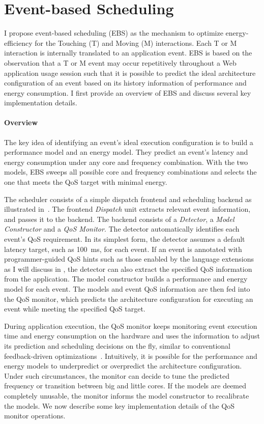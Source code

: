\section{Event-based Scheduling}
\label{sec:runtime:ebs}

I propose event-based scheduling (EBS) as the mechanism to optimize energy-efficiency for the Touching (T) and Moving (M) interactions. Each T or M interaction is internally translated to an application event. EBS is based on the observation that a T or M event may occur repetitively throughout a Web application usage session such that it is possible to predict the ideal architecture configuration of an event based on its history information of performance and energy consumption. I first provide an overview of EBS and discuss several key implementation details.

\paragraph{Overview} The key idea of identifying an event's ideal execution configuration is to build a performance model and an energy model. They predict an event's latency and energy consumption under any core and frequency combination. With the two models, EBS sweeps all possible core and frequency combinations and selects the one that meets the QoS target with minimal energy.

The scheduler consists of a simple dispatch frontend and scheduling backend as illustrated in~. The frontend \textit{Dispatch} unit extracts relevant event information, and passes it to the backend. The backend consists of a \textit{Detector}, a \textit{Model Constructor} and a \textit{QoS Monitor}. The detector
automatically identifies each event's QoS requirement. In its simplest form, the detector assumes a default latency target, such as 100~ms, for each event. If an event is annotated with programmer-guided QoS hints such as those enabled by the \greenweb language extensions as I will discuss in , the detector can also extract the specified QoS information from the application. The model constructor builds a performance and energy model for each event. The models and event QoS information are then fed into the QoS monitor, which predicts the architecture configuration for executing an event while meeting the specified QoS target.

During application execution, the QoS monitor keeps monitoring event execution time and energy consumption on the hardware and uses the information to adjust its prediction and scheduling decisions on the fly, similar to conventional feedback-driven optimizations~\cite{FDO}. Intuitively, it is possible for the performance and energy models to underpredict or overpredict the architecture configuration. Under such circumstances, the monitor can decide to tune the predicted frequency or transition between big and little cores. If the models are deemed completely unusable, the monitor informs the model constructor to recalibrate the models. We now describe some key implementation details of the QoS monitor operations.

